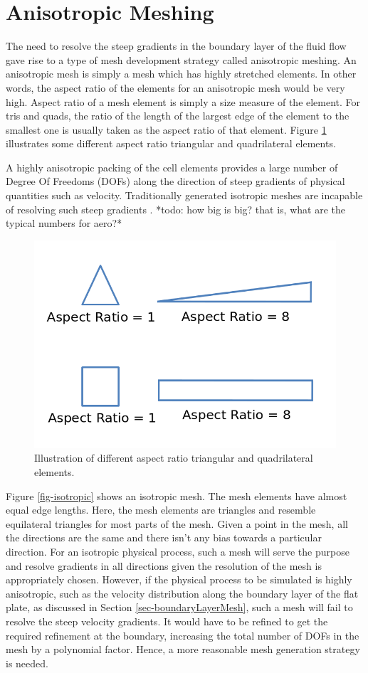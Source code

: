 \section{Anisotropic Meshing}

The need to resolve the steep gradients in the boundary layer of the fluid flow gave rise to a type of mesh development strategy called anisotropic meshing. An anisotropic mesh is simply a mesh which has highly stretched elements. In other words, the aspect ratio of the elements for an anisotropic mesh would be very high. Aspect ratio of a mesh element is simply a size measure of the element. For tris and quads, the ratio of the length of the largest edge of the element to the smallest one is usually taken as the aspect ratio of that element. Figure \ref{fig-AR} illustrates some different aspect ratio triangular and quadrilateral elements. 

A highly anisotropic packing of the cell elements provides a large number of Degree Of Freedoms (DOFs) along the direction of steep gradients of physical quantities such as velocity. Traditionally generated isotropic meshes are incapable of resolving such steep gradients \cite{frey2005anisotropic}. *todo: how big is big? that is, what are the typical numbers for aero?* 

\begin{figure}
	\centering
	\includegraphics[width=0.6\linewidth]{img/intro/aspectRatio.png}
	\caption{Illustration of different aspect ratio triangular and quadrilateral elements.}
	\label{fig-AR}
\end{figure}

Figure \ref{fig-isotropic} shows an isotropic mesh. The mesh elements have almost equal edge lengths. Here, the mesh elements are triangles and resemble equilateral triangles for most parts of the mesh. Given a point in the mesh, all the directions are the same and there isn't any bias towards a particular direction. For an isotropic physical process, such a mesh will serve the purpose and resolve gradients in all directions given the resolution of the mesh is appropriately chosen. However, if the physical process to be simulated is highly anisotropic, such as the velocity distribution along the boundary layer of the flat plate, as discussed in Section \ref{sec-boundaryLayerMesh}, such a mesh will fail to resolve the steep velocity gradients. It would have to be refined to get the required refinement at the boundary, increasing the total number of DOFs in the mesh by a polynomial factor. Hence, a more reasonable mesh generation strategy is needed.

